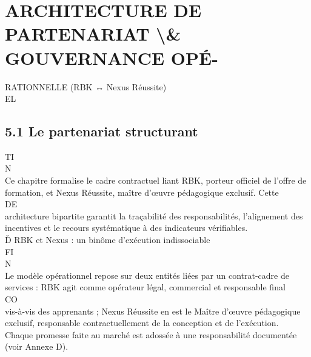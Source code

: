 \documentclass[12pt,landscape,a4paper]{article}
\begin{document}
\section{ARCHITECTURE DE PARTENARIAT \textbackslash{}& GOUVERNANCE OPÉ-}
RATIONNELLE (RBK ↔ Nexus Réussite)\\
\vspace{0.5em}
\vspace{0.5em}
\vspace{0.5em}
\vspace{0.5em}
EL\\
\subsection{5.1 Le partenariat structurant}
\vspace{0.5em}
\vspace{0.5em}
\vspace{0.5em}
\vspace{0.5em}
TI\\
N\\
Ce chapitre formalise le cadre contractuel liant RBK, porteur officiel de l’offre de formation, et Nexus Réussite, maître d’œuvre pédagogique exclusif. Cette\\
\vspace{0.5em}
\vspace{0.5em}
\vspace{0.5em}
\vspace{0.5em}
DE\\
architecture bipartite garantit la traçabilité des responsabilités, l’alignement des incentives et le recours systématique à des indicateurs vérifiables.\\
\vspace{0.5em}
Ď RBK et Nexus : un binôme d’exécution indissociable\\
\vspace{0.5em}
FI\\
N\\
Le modèle opérationnel repose sur deux entités liées par un contrat-cadre de services : RBK agit comme opérateur légal, commercial et responsable final\\
CO\\
vis-à-vis des apprenants ; Nexus Réussite en est le Maître d’œuvre pédagogique exclusif, responsable contractuellement de la conception et de l’exécution.\\
Chaque promesse faite au marché est adossée à une responsabilité documentée (voir Annexe D).\\
\vspace{0.5em}
\vspace{0.5em}
\vspace{0.5em}
\end{document}
